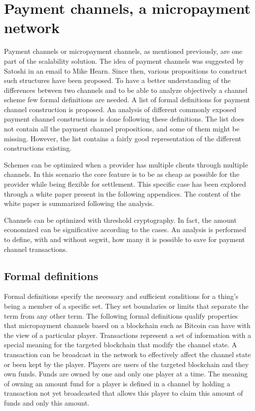 \chapter{Payment channels, a micropayment network}
\label{chap:paymentChannels}

Payment channels or micropayment channels, as mentioned previously, are one part
of the scalability solution. The idea of payment channels was suggested by
Satoshi in an email to Mike Hearn. Since then, various propositions to construct
such structures have been proposed. To have a better understanding of the
differences between two channels and to be able to analyze objectively a channel
scheme few formal definitions are needed. A list of formal definitions for
payment channel construction is proposed. An analysis of different commonly
exposed payment channel constructions is done following these definitions. The
list does not contain all the payment channel propositions, and some of them
might be missing. However, the list contains a fairly good representation of the
different constructions existing.

Schemes can be optimized when a provider has multiple clients through multiple
channels. In this scenario the core feature is to be as cheap as possible for
the provider while being flexible for settlement. This specific case has been
explored through a white paper present in the following appendices. The content
of the white paper is summarized following the analysis.

Channels can be optimized with threshold cryptography. In fact, the amount
economized can be significative according to the cases. An analysis is performed
to define, with and without \gls{segwit}, how many it is possible to save for
payment channel transactions.

\minitoc

\newpage

\section{Formal definitions}

Formal definitions specify the necessary and sufficient conditions for a thing’s
being a member of a specific set. They set boundaries or limits that separate
the term from any other term. The following formal definitions qualify
properties that micropayment channels based on a blockchain such as Bitcoin can
have with the view of a particular player. Transactions represent a set of
information with a special meaning for the targeted blockchain that modify the
channel state. A transaction can be broadcast in the network to effectively
affect the channel state or been kept by the player. Players are users of the
targeted blockchain and they own funds. Funds are owned by one and only one
player at a time. The meaning of owning an amount fund for a player is defined
in a channel by holding a transaction not yet broadcasted that allows this
player to claim this amount of funds and only this amount.


